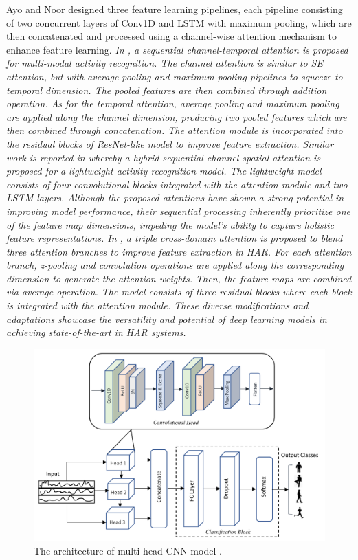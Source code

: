 \documentclass[preprint,12pt]{elsarticle}
\begin{document}
Ayo and Noor \citep{ige_deep_2023} designed three feature learning pipelines, each pipeline consisting of two concurrent layers of Conv1D and LSTM with maximum pooling, which are then concatenated and processed using a channel-wise attention mechanism to enhance feature learning. \emph{In \citep{gao_danhar_2021}, a sequential channel-temporal attention is proposed for multi-modal activity recognition. The channel attention is similar to SE attention, but with average pooling and maximum pooling pipelines to squeeze to temporal dimension. The pooled features are then combined through addition operation. As for the temporal attention, average pooling and maximum pooling are applied along the channel dimension, producing two pooled features which are then combined through concatenation. The attention module is incorporated into the residual blocks of ResNet-like model to improve feature extraction. Similar work is reported in \citep{agac_resource-efficient_2024} whereby a hybrid sequential channel-spatial attention is proposed for a lightweight activity recognition model. The lightweight model consists of four convolutional blocks integrated with the attention module and two LSTM layers. Although the proposed attentions have shown a strong potential in improving model performance, their sequential processing inherently prioritize one of the feature map dimensions, impeding the model's ability to capture holistic feature representations. In \citep{tang_triple_2022}, a triple cross-domain attention is proposed to blend three attention branches to improve feature extraction in HAR. For each attention branch, z-pooling \citep{misra_rotate_2020} and convolution operations are applied along the corresponding dimension to generate the attention weights. Then, the feature maps are combined via average operation. The model consists of three residual blocks where each block is integrated with the attention module. These diverse modifications and adaptations showcase the versatility and potential of deep learning models in achieving state-of-the-art in HAR systems.}

\begin{figure}[h!]
    \centering
    \includegraphics[scale=0.5]{fig_har_multi-head_cnn.png}
    \caption{The architecture of multi-head CNN model \citep{khan_attention_2021}.}
    \label{fig_har_multi-head_cnn}
\end{figure}
\end{document}
